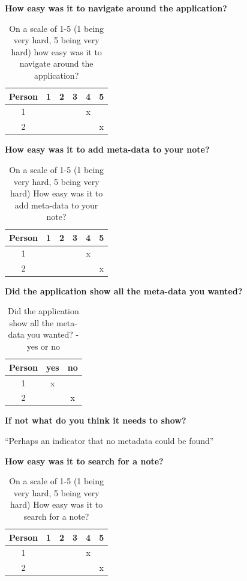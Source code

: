 \vspace{1em}
\noindent
\textbf{How easy was it to navigate around the application?}
\begin{table}[h!]
\centering
 \begin{tabular}{||c c c c c c||}
 \hline
   Person & 1 & 2 & 3 & 4 & 5 \\ [0.5ex]
 \hline\hline
    1 & & & & x &  \\
    2 & & & & & x  \\
 \hline
  \end{tabular}
  \caption{On a scale of 1-5 (1 being very hard, 5 being very hard) how easy was it to navigate around the application?}
\end{table}

\noindent
\textbf{How easy was it to add meta-data to your note?}
\begin{table}[h!]
\centering
 \begin{tabular}{||c c c c c c||}
 \hline
   Person & 1 & 2 & 3 & 4 & 5 \\ [0.5ex]
 \hline\hline
    1 & & & & x &  \\
    2 & & & & & x  \\
 \hline
  \end{tabular}
  \caption{On a scale of 1-5 (1 being very hard, 5 being very hard) How easy was it to add meta-data to your note?}
\end{table}

\noindent
\textbf{Did the application show all the meta-data you wanted?}
\begin{table}[h!]
\centering
 \begin{tabular}{||c c c||}
 \hline
   Person & yes & no \\ [0.5ex]
 \hline\hline
    1 & x &  \\
    2 & & x  \\
 \hline
  \end{tabular}
  \caption{Did the application show all the meta-data you wanted? - yes or no}
\end{table}

\noindent
\textbf{If not what do you think it needs to show?}

``Perhaps an indicator that no metadata could be found''

\noindent
\textbf{How easy was it to search for a note?}
\begin{table}[h!]
\centering
 \begin{tabular}{||c c c c c c||}
 \hline
   Person & 1 & 2 & 3 & 4 & 5 \\ [0.5ex]
 \hline\hline
    1 & & & & x &  \\
    2 & & & & & x  \\
 \hline
  \end{tabular}
  \caption{On a scale of 1-5 (1 being very hard, 5 being very hard) How easy was it to search for a note?}
\end{table}

